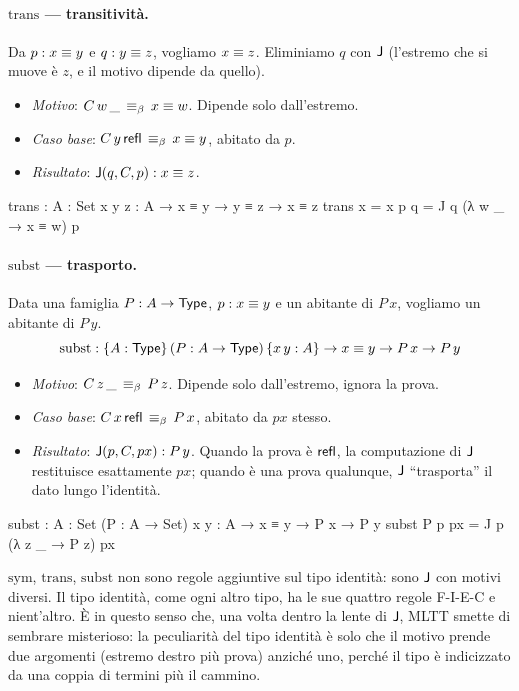 \paragraph{$\mathrm{trans}$ --- transitivit\`a.} Da $p : x \equiv y$ e $q : y \equiv z$, vogliamo $x \equiv z$. Eliminiamo $q$ con $\mathsf{J}$ (l'estremo che si muove \`e $z$, e il motivo dipende da quello).
\begin{itemize}
\item \emph{Motivo}: $C\,w\,\_ \,\equiv_{\beta}\, x \equiv w$. Dipende solo dall'estremo.
\item \emph{Caso base}: $C\,y\,\mathsf{refl} \,\equiv_{\beta}\, x \equiv y$, abitato da $p$.
\item \emph{Risultato}: $\mathsf{J}(q, C, p) : x \equiv z$.
\end{itemize}
\begin{agda}
trans : {A : Set} {x y z : A} → x ≡ y → y ≡ z → x ≡ z
trans {x = x} p q = J q (λ w _ → x ≡ w) p
\end{agda}

\paragraph{$\mathrm{subst}$ --- trasporto.} Data una famiglia $P : A \to \mathsf{Type}$, $p : x \equiv y$ e un abitante di $P\,x$, vogliamo un abitante di $P\,y$.
\[
\mathrm{subst} : \{A : \mathsf{Type}\}\,(P : A \to \mathsf{Type})\,\{x\,y : A\} \to x \equiv y \to P\,x \to P\,y
\]
\begin{itemize}
\item \emph{Motivo}: $C\,z\,\_ \,\equiv_{\beta}\, P\,z$. Dipende solo dall'estremo, ignora la prova.
\item \emph{Caso base}: $C\,x\,\mathsf{refl} \,\equiv_{\beta}\, P\,x$, abitato da $px$ stesso.
\item \emph{Risultato}: $\mathsf{J}(p, C, px) : P\,y$. Quando la prova \`e $\mathsf{refl}$, la computazione di $\mathsf{J}$ restituisce esattamente $px$; quando \`e una prova qualunque, $\mathsf{J}$ ``trasporta'' il dato lungo l'identit\`a.
\end{itemize}
\begin{agda}
subst : {A : Set} (P : A → Set) {x y : A} → x ≡ y → P x → P y
subst P p px = J p (λ z _ → P z) px
\end{agda}

\begin{oss}
$\mathrm{sym}$, $\mathrm{trans}$, $\mathrm{subst}$ non sono regole aggiuntive sul tipo identit\`a: sono $\mathsf{J}$ con motivi diversi. Il tipo identit\`a, come ogni altro tipo, ha le sue quattro regole F-I-E-C e nient'altro. \`E in questo senso che, una volta dentro la lente di $\mathsf{J}$, MLTT smette di sembrare misterioso: la peculiarit\`a del tipo identit\`a \`e solo che il motivo prende due argomenti (estremo destro pi\`u prova) anzich\'e uno, perch\'e il tipo \`e indicizzato da una coppia di termini pi\`u il cammino.
\end{oss}

